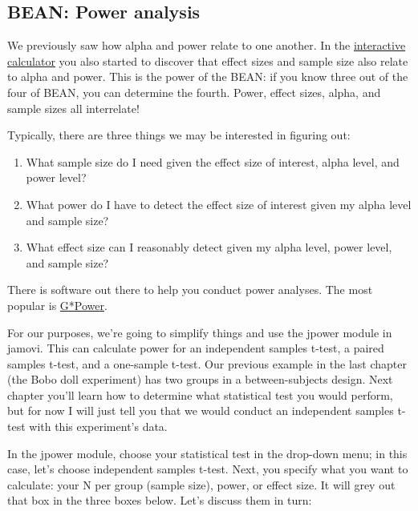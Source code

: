 \documentclass[
]{book}
\providecommand{\tightlist}{%
  \setlength{\itemsep}{0pt}\setlength{\parskip}{0pt}}
\begin{document}
\hypertarget{bean-power-analysis}{%
\subsection{BEAN: Power analysis}\label{bean-power-analysis}}

We previously saw how alpha and power relate to one another. In the \href{https://rpsychologist.com/d3/pdist/}{interactive calculator} you also started to discover that effect sizes and sample size also relate to alpha and power. This is the power of the BEAN: if you know three out of the four of BEAN, you can determine the fourth. Power, effect sizes, alpha, and sample sizes all interrelate!

Typically, there are three things we may be interested in figuring out:

\begin{enumerate}
\def\labelenumi{\arabic{enumi}.}
\tightlist
\item
  What sample size do I need given the effect size of interest, alpha level, and power level?
\item
  What power do I have to detect the effect size of interest given my alpha level and sample size?
\item
  What effect size can I reasonably detect given my alpha level, power level, and sample size?
\end{enumerate}

There is software out there to help you conduct power analyses. The most popular is \href{https://www.psychologie.hhu.de/arbeitsgruppen/allgemeine-psychologie-und-arbeitspsychologie/gpower.html}{G*Power}.

For our purposes, we're going to simplify things and use the jpower module in jamovi. This can calculate power for an independent samples t-test, a paired samples t-test, and a one-sample t-test. Our previous example in the last chapter (the Bobo doll experiment) has two groups in a between-subjects design. Next chapter you'll learn how to determine what statistical test you would perform, but for now I will just tell you that we would conduct an independent samples t-test with this experiment's data.

In the jpower module, choose your statistical test in the drop-down menu; in this case, let's choose independent samples t-test. Next, you specify what you want to calculate: your N per group (sample size), power, or effect size. It will grey out that box in the three boxes below. Let's discuss them in turn:
\end{document}
